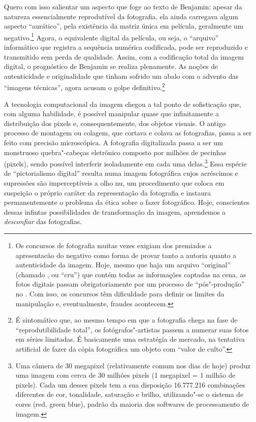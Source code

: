 Quero com isso salientar um aspecto que foge ao texto de Benjamin: apesar da natureza essencialmente reprodutível da fotografia, ela ainda carregava algum aspecto ``aurático'', pela existência da matriz única em película, geralmente um negativo.\footnote{Os concursos de fotografia muitas vezes exigiam dos premiados a apresentacão do negativo como forma de provar tanto a autoria quanto a autenticidade da imagem. Hoje, mesmo que haja um arquivo ``original'' (chamado , ou ``cru'') que contém todas as informações captadas na cena, as fotos digitais passam obrigatoriamente por um processo de ``pós"-produção'' no {}. Com isso, os concursos têm dificuldade para definir os limites da manipulação e, eventualmente, fraudes acontecem.} Agora, o equivalente digital da película, ou seja, o ``arquivo'' informático que registra a sequência numérica codificada, pode ser reproduzido e transmitido sem perda de qualidade. Assim, com a codificação total da imagem digital, o prognóstico de Benjamin se realiza plenamente. As noções de autenticidade e originalidade que tinham sofrido um abalo com o advento das ``imagens técnicas'', agora acusam o golpe definitivo.\footnote{É sintomático que, ao mesmo tempo em que a fotografia chega na fase de ``reprodutibilidade total'', os fotógrafos"-artistas passem a numerar suas fotos em séries limitadas. É basicamente uma estratégia de mercado, na tentativa artificial de fazer da cópia fotográfica um objeto com ``valor de culto''. }

A tecnologia computacional da imagem chegou a tal ponto de sofisticação
que, com alguma habilidade, é possível manipular quase que infinitamente
a distribuição dos pixels e, consequentemente, dos objetos visuais. O
antigo processo de montagem ou colagem, que cortava e colava as
fotografias, passa a ser feito com precisão microscópica. A fotografia
digitalizada passa a ser um monstruoso quebra"-cabeças eletrônico
composto por milhões de pecinhas (pixels), sendo possível interferir
isoladamente em cada uma delas.\footnote{Uma câmera de 30 megapixel
  (relativamente comum nos dias de hoje) produz uma imagem com cerca de
  30 milhões pixels (1 megapixel = 1 milhão de pixels). Cada um desses
  pixels tem a sua disposição 16.777.216 combinações diferentes de cor,
  tonalidade, saturação e brilho, utilizando"-se o sistema de cores 
  (red, green blue), padrão da maioria dos softwares de processamento de
  imagem.} Essa espécie de ``pictorialismo digital'' resulta numa imagem
fotográfica cujos acréscimos e supressões são imperceptíveis a olho nu,
um procedimento que coloca em suspeição o próprio caráter da
representação da fotografia e instaura permanentemente o problema da
ética sobre o fazer fotográfico. Hoje, conscientes dessas infintas possibilidades de transformação da imagem, aprendemos a \emph{desconfiar} das fotografias.

